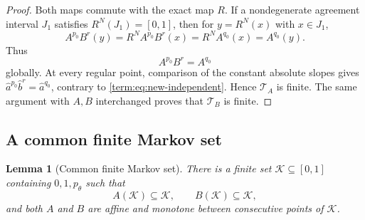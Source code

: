 \documentclass[11pt]{article}
\newtheorem{lemma}[theorem]{Lemma}
\theoremstyle{definition}
\theoremstyle{remark}
\newcommand{\I}{[0,1]}
\begin{document}
\begin{proof}
Both maps commute with the exact map $R$.  If a nondegenerate agreement
interval $J_1$ satisfies $R^N(J_1)=\I$, then for $y=R^N(x)$ with
$x\in J_1$,
\[
 A^{p_0}B^r(y)=R^N A^{p_0}B^r(x)
              =R^N A^{q_0}(x)=A^{q_0}(y).
\]
Thus
\begin{equation}\label{term:eq:global-tail-relation}
 A^{p_0}B^r=A^{q_0}
\end{equation}
globally.  At every regular point, comparison of the constant absolute
slopes gives
$\widehat a^{p_0}\widehat b^r=\widehat a^{q_0}$, contrary to
\eqref{term:eq:new-independent}.  Hence $\mathcal T_A$ is finite.  The
same argument with $A,B$ interchanged proves that $\mathcal T_B$ is finite.
\end{proof}

\subsection{A common finite Markov set}

\begin{lemma}[Common finite Markov set]
\label{lem:common-Markov-set}
There is a finite set $\mathcal K\subseteq\I$ containing $0,1,p_\theta$
such that
\[
 A(\mathcal K)\subseteq\mathcal K,\qquad
 B(\mathcal K)\subseteq\mathcal K,
\]
and both $A$ and $B$ are affine and monotone between consecutive points of
$\mathcal K$.
\end{lemma}
\end{document}
